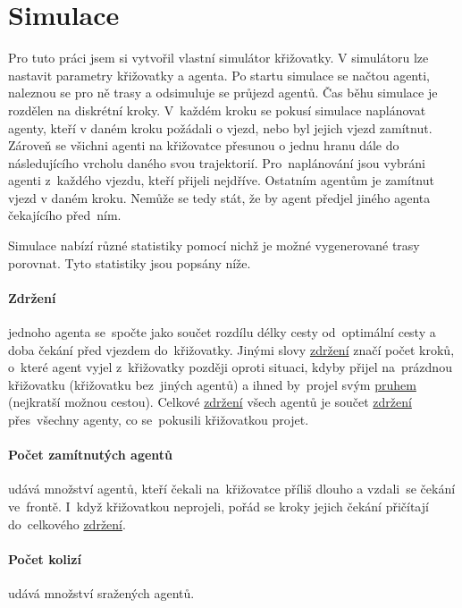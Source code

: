 \section{Simulace}\label{sec:simulace}

%

Pro tuto práci jsem si vytvořil vlastní simulátor křižovatky.
V simulátoru lze nastavit parametry křižovatky a agenta.
Po startu simulace se načtou agenti, naleznou se pro ně trasy a odsimuluje se průjezd agentů.
Čas běhu simulace je rozdělen na diskrétní kroky.
V~každém kroku se pokusí simulace naplánovat agenty, kteří v daném kroku požádali o vjezd, nebo byl jejich vjezd zamítnut.
Zároveň se všichni agenti na křižovatce přesunou o jednu hranu dále do následujícího vrcholu daného svou trajektorií.
Pro~naplánování jsou vybráni agenti z~každého vjezdu, kteří přijeli nejdříve.
Ostatním agentům je zamítnut vjezd v daném kroku.
Nemůže se tedy stát, že by agent předjel jiného agenta čekajícího před~ním.

Simulace nabízí různé statistiky pomocí nichž je možné vygenerované trasy porovnat.
Tyto statistiky jsou popsány níže.

\paragraph{Zdržení} \label{par:zdrzeni} jednoho agenta se~spočte jako součet
rozdílu délky cesty od~optimální cesty a doba čekání před vjezdem do~křižovatky.
Jinými slovy \hyperref[item:zdrzeni]{zdržení} značí počet kroků, o~které agent vyjel z~křižovatky později oproti situaci,
kdyby přijel na~prázdnou křižovatku (křižovatku bez~jiných agentů) a
ihned by~projel svým \hyperref[par:pruh]{pruhem} (nejkratší možnou cestou).
Celkové \hyperref[item:zdrzeni]{zdržení} všech agentů je součet \hyperref[item:zdrzeni]{zdržení} přes~všechny agenty,
co se~pokusili křižovatkou projet.

\paragraph{Počet zamítnutých agentů}\label{par:zamitnuti} udává množství agentů, kteří čekali na~křižovatce příliš dlouho a
vzdali~se čekání ve~frontě.
I~když křižovatkou neprojeli, pořád se kroky jejich čekání přičítají do~celkového \hyperref[item:zdrzeni]{zdržení}.

\paragraph{Počet kolizí}\label{par:kolize} udává množství sražených agentů.

